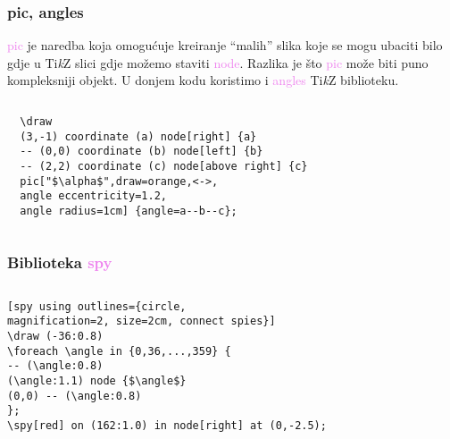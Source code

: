 \documentclass{beamer}
\begin{document}
\begin{frame}[fragile]
\frametitle{pic, angles}  
\textcolor{violet}{pic} je naredba koja omogućuje kreiranje \enquote{malih} slika koje se mogu ubaciti bilo gdje u Ti\emph{k}Z slici gdje možemo staviti  \textcolor{violet}{node}. Razlika je što \textcolor{violet}{pic} može biti puno kompleksniji objekt. U donjem kodu koristimo i \textcolor{violet}{angles} Ti\emph{k}Z biblioteku.
\begin{columns}
\column{30mm}
\column{80mm}
\small
\begin{lstlisting}
  \draw
  (3,-1) coordinate (a) node[right] {a}
  -- (0,0) coordinate (b) node[left] {b}
  -- (2,2) coordinate (c) node[above right] {c}
  pic["$\alpha$",draw=orange,<->,
  angle eccentricity=1.2,
  angle radius=1cm] {angle=a--b--c}; 
\end{lstlisting}
\end{columns}
\end{frame}

\begin{frame}[fragile]
\frametitle{Biblioteka \textcolor{violet}{spy}}
\begin{columns}
\column{30mm}
\column{78mm}
\small
\begin{lstlisting}
[spy using outlines={circle,
magnification=2, size=2cm, connect spies}]
\draw (-36:0.8)
\foreach \angle in {0,36,...,359} {
-- (\angle:0.8)
(\angle:1.1) node {$\angle$} 
(0,0) -- (\angle:0.8)
};
\spy[red] on (162:1.0) in node[right] at (0,-2.5); 
\end{lstlisting}
\end{columns}
\end{frame}
\end{document}
